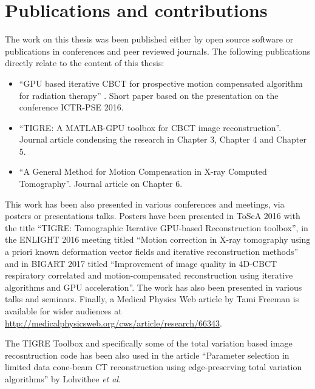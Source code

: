 \FloatBarrier


\section{Publications and contributions}

The work on this thesis was been published either by open source software or publications in conferences and peer reviewed journals. The following publications directly relate to the content of this thesis:

\begin{itemize}
\item ``GPU based iterative CBCT for prospective motion compensated algorithm for radiation therapy''\cite{biguri2016gpu} . Short paper based on the presentation on the conference ICTR-PSE 2016.
\item ``TIGRE: A MATLAB-GPU toolbox for CBCT image reconstruction''\cite{TIGRE}. Journal article condensing the research in Chapter 3, Chapter 4 and Chapter 5.
\item  ``A General Method for Motion Compensation in X-ray Computed Tomography''\cite{biguri2017general}. Journal article on Chapter 6.
\end{itemize}

This work has been also presented in various conferences and meetings, via posters or presentations talks. Posters have been presented in ToScA 2016 with the title ``TIGRE: Tomographic Iterative GPU-based Reconstruction toolbox''\cite{biguri_ander_2016_159016}, in the ENLIGHT 2016 meeting titled ``Motion correction in X-ray tomography using a priori known deformation vector fields and iterative reconstruction methods''\cite{biguri2016motion} and in BIGART 2017 titled ``Improvement of image quality in 4D-CBCT respiratory correlated and motion-compensated reconstruction using iterative algorithms and GPU acceleration''\cite{biguri2017motion}. The work has also been presented in various talks and seminars. Finally, a Medical Physics Web article by Tami Freeman is available for wider audiences at \href{http://medicalphysicsweb.org/cws/article/research/66343}{http://medicalphysicsweb.org/cws/article/research/66343}.

The TIGRE Toolbox and specifically some of the total variation based image recosntruction code has been also used in the article ``Parameter selection in limited data cone-beam CT reconstruction using edge-preserving total variation algorithms'' by Lohvithee \textit{et al}\cite{Vee}.

